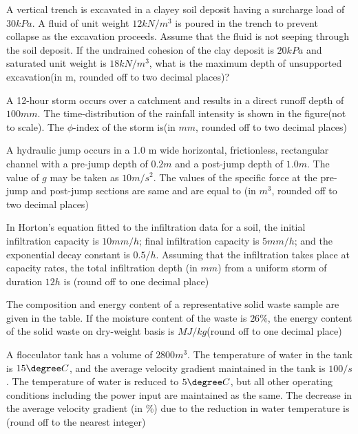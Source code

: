 	\item
	A vertical trench is excavated in a clayey soil deposit having a surcharge load of $30 kPa$. A fluid of unit weight $12 kN/m^{3}$ is poured in the trench to prevent collapse as the excavation proceeds. Assume that the fluid is not seeping through the soil deposit. If the undrained cohesion of the clay deposit is $20 kPa$ and saturated unit weight is $18 kN/m^{3}$, what is the maximum depth of unsupported excavation(in m, rounded off to two decimal places)?
	\item
	A 12-hour storm occurs over a catchment and results in a direct runoff depth of $100 mm$. The time-distribution of the rainfall intensity is shown in the figure(not to scale). The $\phi$-index of the storm is(in $mm$, rounded off to two decimal places)
	
    		
    		
	\item
	A hydraulic jump occurs in a 1.0 m wide horizontal, frictionless, rectangular channel with a pre-jump depth of $0.2 m$ and a post-jump depth of $1.0 m$. The value of $g$ may be taken as $10 m/s^2$. The values of the specific force at the pre-jump and post-jump sections are same and are equal to (in $m^3$, rounded off to two decimal places)
	\item
	In Horton's equation fitted to the infiltration data for a soil, the initial infiltration capacity is $10 mm/h$; final infiltration capacity is $5 mm/h$; and the exponential decay constant is $0.5 /h$. Assuming that the infiltration takes place at capacity rates, the total infiltration depth (in $mm$) from a uniform storm of duration $12 h$ is (round off to one decimal place)
	\item
	The composition and energy content of a representative solid waste sample are given in the table. If the moisture content of the waste is $26 \%$, the energy content of the solid waste on dry-weight basis is $MJ/kg$(round off to one decimal place)
		
    			 
		
	\item
	A flocculator tank has a volume of $2800 m^3$. The temperature of water in the tank is $15 \degree C$, and the average velocity gradient maintained in the tank is $100/s$. The temperature of water is reduced to $5 \degree C$, but all other operating conditions including the power input are maintained as the same. The decrease in the average velocity gradient (in \%) due to the reduction in water temperature is (round off to the nearest integer)
	
